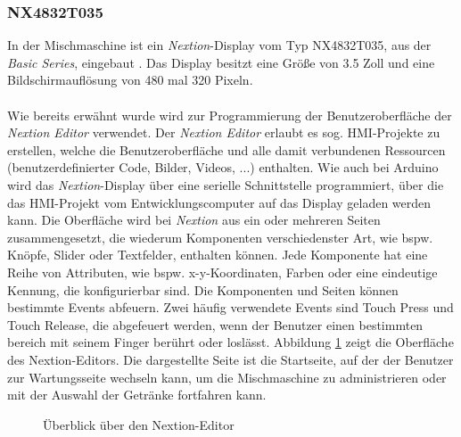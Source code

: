 \subsubsection{NX4832T035}
In der Mischmaschine ist ein \textit{Nextion}-Display vom Typ NX4832T035, aus der \textit{Basic Series}, eingebaut \cite{nx4832t035}. Das Display besitzt eine Größe von 3.5 Zoll und eine Bildschirmauflösung von 480 mal 320 Pixeln.\\\\
Wie bereits erwähnt wurde wird zur Programmierung der Benutzeroberfläche der \textit{Nextion Editor} verwendet. Der \textit{Nextion Editor} erlaubt es sog. HMI-Projekte zu erstellen, welche die Benutzeroberfläche und alle damit verbundenen Ressourcen (benutzerdefinierter Code, Bilder, Videos, ...) enthalten. Wie auch bei Arduino wird das \textit{Nextion}-Display über eine serielle Schnittstelle programmiert, über die das HMI-Projekt vom Entwicklungscomputer auf das Display geladen werden kann. Die Oberfläche wird bei \textit{Nextion} aus ein oder mehreren Seiten zusammengesetzt, die wiederum Komponenten verschiedenster Art, wie bspw. Knöpfe, Slider oder Textfelder, enthalten können. Jede Komponente hat eine Reihe von Attributen, wie bspw. x-y-Koordinaten, Farben oder eine eindeutige Kennung, die konfigurierbar sind. Die Komponenten und Seiten können bestimmte Events abfeuern. Zwei häufig verwendete Events sind \glqq{}Touch Press\grqq{} und \glqq{}Touch Release\grqq{}, die abgefeuert werden, wenn der Benutzer einen bestimmten bereich mit seinem Finger berührt oder loslässt. Abbildung \ref{img:nextion_editor_overview} zeigt die Oberfläche des Nextion-Editors. Die dargestellte Seite ist die Startseite, auf der der Benutzer zur Wartungsseite wechseln kann, um die Mischmaschine zu administrieren oder mit der Auswahl der Getränke fortfahren kann.
\begin{figure}[H]
    \centering
    \caption{Überblick über den Nextion-Editor}
    \label{img:nextion_editor_overview}
\end{figure}
